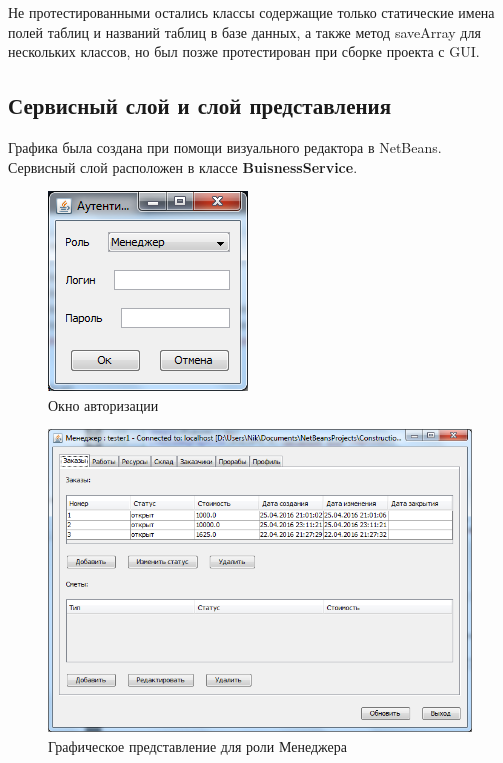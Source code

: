 \documentclass[12pt,a4paper,titlepage]{article}
\begin{document}
Не протестированными остались классы содержащие только статические 
имена полей таблиц и названий таблиц в базе данных, а также метод saveArray для нескольких классов, но был позже протестирован при сборке проекта с GUI.
\newpage
\subsection{Сервисный слой и слой представления}
Графика была создана при помощи визуального редактора в NetBeans.
Сервисный слой расположен в классе \textbf{BuisnessService}. 

\begin{figure}[!ht]
\includegraphics[scale=0.6]{images/auth.png}\caption{Окно авторизации}
\end{figure}

\begin{figure}[!ht]
\includegraphics[scale=0.6]{images/ManagerView.png}\caption{Графическое представление для роли Менеджера}
\end{figure}
\end{document}
